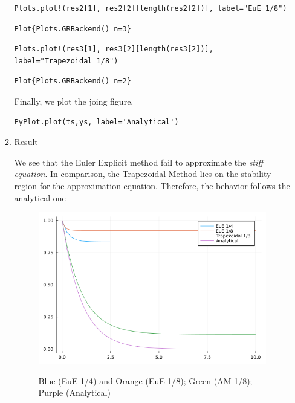 \documentclass[11pt]{article}
\begin{document}
\begin{enumerate}
\begin{enumerate}
\begin{verbatim}
Plots.plot!(res2[1], res2[2][length(res2[2])], label="EuE 1/8")
\end{verbatim}

\begin{verbatim}
Plot{Plots.GRBackend() n=3}
\end{verbatim}



\begin{verbatim}
Plots.plot!(res3[1], res3[2][length(res3[2])], label="Trapezoidal 1/8")
\end{verbatim}

\begin{verbatim}
Plot{Plots.GRBackend() n=2}
\end{verbatim}



Finally, we plot the joing figure,
\begin{verbatim}
PyPlot.plot(ts,ys, label='Analytical')
\end{verbatim}

\item Result
\label{sec:orge170292}

We see that the Euler Explicit method fail to approximate the \emph{stiff equation}.
In comparison, the Trapezoidal Method lies on the stability region for the
approximation equation. Therefore, the behavior follows the analytical one

\begin{figure}[!htb]
  \centering
  \caption{\label{fig:sim1} Blue (EuE 1/4) and Orange (EuE 1/8); Green (AM 1/8); Purple (Analytical)}
  \includegraphics[width=0.45\linewidth]{Resources/img/exponential.png}
  \\ %
\end{figure}
\clearpage
\end{enumerate}
\end{enumerate}
\end{document}
